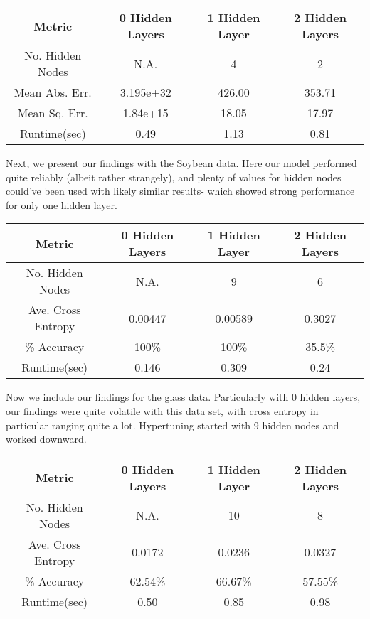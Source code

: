 \documentclass[twoside,11pt]{article}
\begin{document}
\begin{center}
	\begin{tabular}{|c c c c|}
		\hline
		Metric & 0 Hidden Layers & 1 Hidden Layer & 2 Hidden Layers \\ [0.5ex]
		\hline \hline
		No. Hidden Nodes & N.A. & 4 & 2 \\
		\hline
		Mean Abs. Err. & 3.195e+32 & 426.00 & 353.71 \\
		\hline
		Mean Sq. Err. & 1.84e+15 & 18.05 & 17.97 \\
		\hline
		Runtime(sec) & 0.49 & 1.13 &  0.81 \\
		\hline
	\end{tabular}
\end{center}

Next, we present our findings with the Soybean data. Here our model performed quite reliably (albeit rather strangely), 
and plenty of values for hidden nodes could've been used with likely similar results- which showed strong performance for only one hidden layer.

\begin{center}
	\begin{tabular}{|c c c c|}
		\hline
		Metric & 0 Hidden Layers & 1 Hidden Layer & 2 Hidden Layers \\ [0.5ex]
		\hline \hline
		No. Hidden Nodes & N.A. & 9 & 6 \\
		\hline
		Ave. Cross Entropy & 0.00447 & 0.00589 & 0.3027 \\
		\hline
		\% Accuracy & 100\% & 100\% & 35.5\% \\
		\hline
		Runtime(sec) & 0.146 & 0.309 & 0.24 \\
		\hline
	\end{tabular}
\end{center}

Now we include our findings for the glass data. Particularly with 0 hidden layers, our findings were quite volatile
with this data set, with cross entropy in particular ranging quite a lot. Hypertuning started
with 9 hidden nodes and worked downward.

\begin{center}
	\begin{tabular}{|c c c c|}
		\hline
		Metric & 0 Hidden Layers & 1 Hidden Layer & 2 Hidden Layers \\ [0.5ex]
		\hline \hline
		No. Hidden Nodes & N.A. & 10 & 8 \\
		\hline
		Ave. Cross Entropy & 0.0172 & 0.0236 & 0.0327 \\
		\hline
		\% Accuracy & 62.54\% & 66.67\% & 57.55\% \\
		\hline
		Runtime(sec) & 0.50 & 0.85 & 0.98 \\
		\hline
	\end{tabular}
\end{center}
\end{document}
